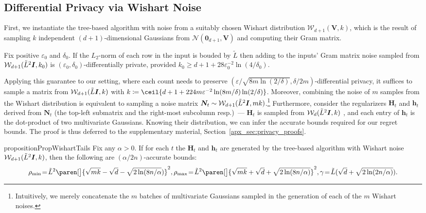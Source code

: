 \documentclass{article}
\renewcommand{\vec}[1]{\bm{#1}}
\newcommand{\defeq}{\coloneq}
\DeclarePairedDelimiter{\paren}()
\DeclarePairedDelimiter{\ceil}\lceil\rceil
\newcommand{\Wishart}{\mathcal{W}}
\newcommand{\Normal}{\mathcal{N}}
\newcommand{\Eye}[1][]{\bm{I}\notblank{#1}{_{{#1}\times{#1}}}{}}
\begin{document}
\subsection{Differential Privacy via Wishart Noise}
\label{sec:dp-wishart}

First, we instantiate the tree-based algorithm with noise from a
suitably chosen Wishart distribution $\Wishart_{d+1}(\vec V, k)$, which is the
result of sampling $k$ independent $(d+1)$-dimensional Gaussians from
$\Normal(\vec 0_{d+1}, \vec V)$ and computing their Gram
matrix.

\begin{theorem}%
  \label{thm:wishart-cont-dp}
  Fix positive $\varepsilon_0$ and $\delta_0$. If the $L_2$-norm of each
  row in the input is bouded by $\tilde L$ then adding to the inputs'
  Gram matrix noise sampled from $\Wishart_{d+1}(\tilde
  L^2 \Eye, k_0)$ is $(\varepsilon_0,\delta_0)$-differentially private,
  provided $k_0\geq d+1 + 28\varepsilon_0^{-2}\ln(4/\delta_0)$.
\end{theorem}
Applying this guarantee to our setting, where each count needs to
preserve
$(\varepsilon/\sqrt{8m\ln(2/\delta)}, \delta/2m)$-differential
privacy, it suffices to sample a matrix from
$\Wishart_{d+1}(\tilde{L} \Eye, k)$ with
$k \defeq \ceil{d+1 + 224
  m\varepsilon^{-2}\ln(8m/\delta)\ln(2/\delta)}$. Moreover, combining
the noise of $m$ samples from the Wishart distribution is equivalent
to sampling a noise matrix
$\vec N_t\sim \Wishart_{d+1}(\tilde L^2\Eye, mk)$.\footnote{Intuitively, we merely
concatenate the $m$ batches of multivariate Gaussians sampled in the
generation of each of the $m$ Wishart noises.} Furthermore, consider
the regularizers $\vec H_t$ and $\vec h_t$ derived from $\vec N_t$ (the top-left
submatrix and the right-most subcolumn resp.)~--- $\vec H_t$ is sampled
from $\Wishart_d(\tilde L^2\Eye,k)$ , and each entry of $\vec h_t$ is
the dot-product of two multivariate Gaussians. Knowing their
distribution, we can infer the accurate bounds required for our regret
bounds. The proof is thus deferred to the supplementary material, Section~\ref{apx_sec:privacy_proofs}.
\begin{restatable}{proposition}{PropWishartTails}
\label{pro:accurate_bounds_for_Wishart}
Fix any $\alpha>0$. If for each $t$ the $\vec H_t$ and $\vec h_t$ are
generated by the tree-based algorithm with Wishart noise
$\Wishart_{d+1}(\tilde L^2 \Eye, k)$, then the following
are $(\alpha/2n)$-accurate bounds:
{\small
  \renewcommand\defeq{\!=\!}
  \begin{align*}
    \rho_{\min} \defeq \tilde L^2 \paren[\big]{\sqrt{mk}
                 - \sqrt{d} - \sqrt{2\ln(8n/\alpha})}^2,
    \rho_{\max} \defeq \tilde L^2 \paren[\big]{\sqrt{mk}
                 + \sqrt{d} + \sqrt{2\ln(8n/\alpha)}}^2,
    \gamma \defeq \tilde L(\sqrt{d} + \sqrt{2\ln(2n/\alpha)}).
 \end{align*}}
\end{restatable}
\end{document}
